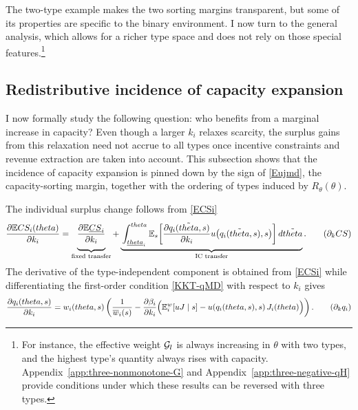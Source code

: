 \documentclass{class}
\begin{document}
The two-type example makes the two sorting margins transparent, but some of its properties are specific to the binary environment. I now turn to the general analysis, which allows for a richer type space and does not rely on those special features.\footnote{For instance, the effective weight $\mathcal{G}_l$ is always increasing in $\theta$ with two types, and the highest type's quantity always rises with capacity. Appendix~\ref{app:three-nonmonotone-G} and Appendix~\ref{app:three-negative-qH} provide conditions under which these results can be reversed with three types.}

\subsection{Redistributive incidence of capacity expansion}\label{sec:surplus}
 
I now formally study the following question: who benefits from a marginal increase in capacity? Even though a larger $k_i$ relaxes scarcity, the surplus gains from this relaxation need not accrue to all types once incentive constraints and revenue extraction are taken into account. This subsection shows that the incidence of capacity expansion is pinned down by the sign of \ref{Eujmd}, the capacity-sorting margin, together with the ordering of types induced by $R_\theta(\theta)$.

The individual surplus change follows from \ref{ECSi}
\begin{equation}
  \frac{\partial\mathbb{E} CS_i(theta)}{\partial k_i} = \underbrace{\Bigg.\frac{\partial\mathbb{E}\underline{CS}_i}{\partial k_i}\Bigg.}_{ \text{fixed transfer} } +\underbrace{\Bigg. \int_{\underline{theta}_i}^{theta} \mathbb{E}_s\!\left[\frac{\partial q_i(\tilde{theta},s)}{\partial k_i} u\!\left(q_i(\tilde{theta},s),s\right)\right]d\tilde{theta}\Bigg. }_{\text{IC transfer}}. \tag{$\partial_k CS$}\label{partialkCS1}
\end{equation}
The derivative of the type-independent component is obtained from \ref{ECSi} while differentiating the first-order condition \ref{KKT-qMD} with respect to $k_i$ gives
\begin{equation}
  \frac{\partial q_i(theta,s)}{\partial k_i} = w_i(theta,s)\left( \frac{1}{\overline w_i(s)} -\frac{\partial\beta_i}{\partial k_i} \Bigl(\mathbb{E}^w_i[uJ\mid s] -u\!\left(q_i(theta,s),s\right)J_i(theta)\Bigr) \right). \tag{$\partial_k q_i$}\label{partialkq1}
\end{equation}
\end{document}
